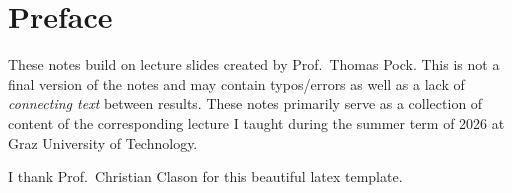 \chapter*{Preface}
\enlargethispage*{2cm}

These notes build on lecture slides created by Prof.~Thomas Pock.
This is not a final version of the notes and may contain typos/errors as well as a lack of \emph{connecting text} between results. These notes primarily serve as a collection of content of the corresponding lecture I taught during the summer term of 2026 at Graz University of Technology.

I thank Prof.~Christian Clason for this beautiful latex template.